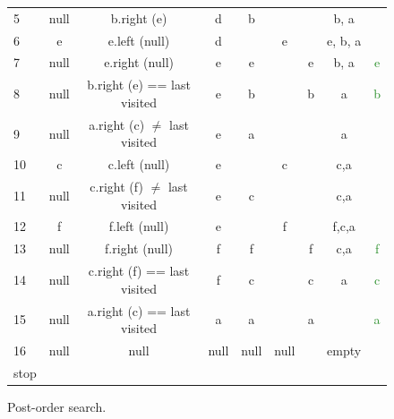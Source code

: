 \begin{figure}[H]
\begin{tabular}{ l|c|c|c|c|c|c|c|c}
5 & \textcolor{BrickRed}{null} & b.right (\textcolor{BrickRed}{e}) & d & b & & & b, a & \\
 
6 & e & e.left (\textcolor{BrickRed}{null}) & d & & e & & e, b, a & \\
 
7 & \textcolor{BrickRed}{null} & e.right (\textcolor{BrickRed}{null}) & e & e & & e & b, a & \textcolor{ForestGreen}{e} \\
 
8 & \textcolor{BrickRed}{null} & b.right (\textcolor{BrickRed}{e}) == last visited & e & b & & b & a & \textcolor{ForestGreen}{b} \\
 
9 & \textcolor{BrickRed}{null} & a.right (\textcolor{BrickRed}{c}) $\neq$ last visited & e & a & & & a & \\
 
10 & c & c.left (\textcolor{BrickRed}{null}) & e &  & c &  & c,a & \\
  
11 & \textcolor{BrickRed}{null} & c.right (\textcolor{BrickRed}{f}) $\neq$ last visited & e & c & & & c,a & \\

12 & f & f.left (\textcolor{BrickRed}{null}) & e & & f & & f,c,a & \\

13 & \textcolor{BrickRed}{null} & f.right (\textcolor{BrickRed}{null}) & f & f & & f & c,a & \textcolor{ForestGreen}{f} \\

14 & \textcolor{BrickRed}{null} & c.right (\textcolor{BrickRed}{f}) == last visited & f & c & & c & a & \textcolor{ForestGreen}{c} \\

15 & \textcolor{BrickRed}{null} & a.right (\textcolor{BrickRed}{c}) == last visited & a & a & & a &  & \textcolor{ForestGreen}{a} \\

16 & \textcolor{BrickRed}{null} & \textcolor{BrickRed}{null} & \textcolor{BrickRed}{null} & \textcolor{BrickRed}{null} & \textcolor{BrickRed}{null} &  & \textcolor{BrickRed}{empty} & \\

\textcolor{BrickRed}{stop} & & &  & & &  &  &  \\
 
\end{tabular}
\caption[Post-order search.]{Post-order search.}
\label{trees_7}
\end{figure}

